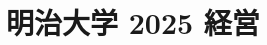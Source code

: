 \documentclass[../../uem_mat_mei_q.tex]{subfiles}
\begin{document}
    \section{明治大学 2025 経営}
    \subsection{　}
    
    \newpage
    \subsection{　}
    
    \newpage
    \subsection{　}
    
\end{document}
